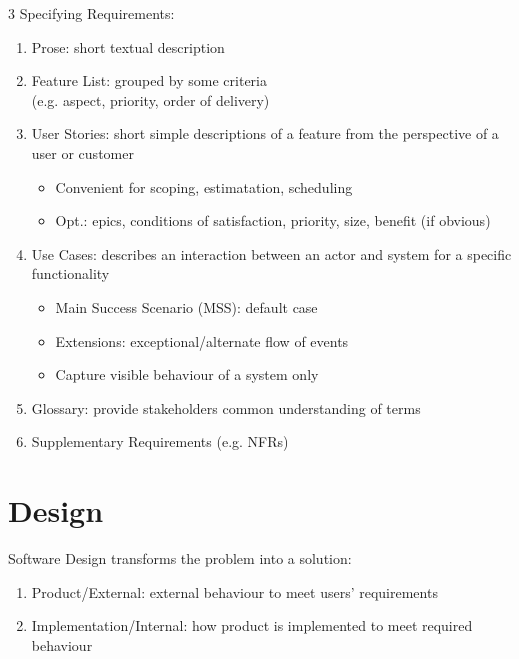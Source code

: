\documentclass[12pt, a4paper]{article}
\begin{document}
\begin{multicols*}{3}
Specifying Requirements:
\begin{enumerate}[\roman*.]
  \item Prose: short textual description 
  \item Feature List: grouped by some criteria\\(e.g. aspect, priority, order of delivery)
  \item User Stories: short simple descriptions of a feature from the perspective of a user or customer
    \begin{itemize}[leftmargin=*]\vspace{3pt}
      \item Convenient for scoping, estimatation, scheduling 
      \item Opt.: epics, conditions of satisfaction, priority, size, benefit (if obvious) 
    \end{itemize}
  \item Use Cases: describes an interaction between an actor and system for a specific functionality
    \begin{itemize}[leftmargin=*]\vspace{3pt}
      \item Main Success Scenario (MSS): default case 
      \item Extensions: exceptional/alternate flow of events
      \item Capture visible behaviour of a system only
    \end{itemize}
  \item Glossary: provide stakeholders common understanding of terms
  \item Supplementary Requirements (e.g. NFRs)
\end{enumerate}
\vspace{-1em}
\colbreak
\section{Design}
Software Design transforms the problem into a solution:
\begin{enumerate}[\roman*.]
  \item Product/External: external behaviour to meet users' requirements
  \item Implementation/Internal: how product is implemented to meet required behaviour
\end{enumerate}


\end{multicols*}
\end{document}
